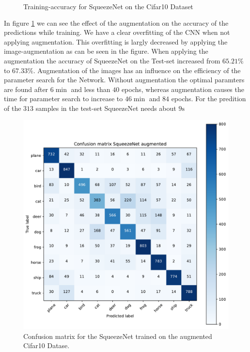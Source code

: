 \documentclass[11pt]{article}
\begin{document}
\begin{figure}
\centering
{}
  \hfill
  \hfill
\caption{Training-accuracy for SqueezeNet on the Cifar10 Dataset}
\label{rescnn::1}
\end{figure}

In figure \ref{rescnn::1} we can see the effect of the augmentation on the accuracy of the predictions while training. We have a clear overfitting of the CNN when not applying augmentation. This overfitting is largly decreased by applying the image-augmentation as can be seen in the figure. When applying the augmentation the accuracy of SqueezeNet on the Test-set increased from $65.21\%$ to $67.33\%$. Augmentation of the images has an influence on the efficiency of the parameter search for the Network. Without augmentation the optimal paramters are found after $6 \min$ and less than $40$ epochs, whereas augmentation causes the time for parameter search to increase to $46 \min$ and $84$ epochs. For the predition of the $313$ samples in the test-set SqueezeNet needs about $9 \text{s}$ 

\begin{figure}
\centering
\includegraphics[width=0.5\columnwidth]{squeezeNet_cifar10_aug_confmat.pdf}
\caption{Confusion matrix for the SqueezeNet trained on the augmented Cifar10 Datase.}
\label{rescnn::2}
\end{figure}
\end{document}
